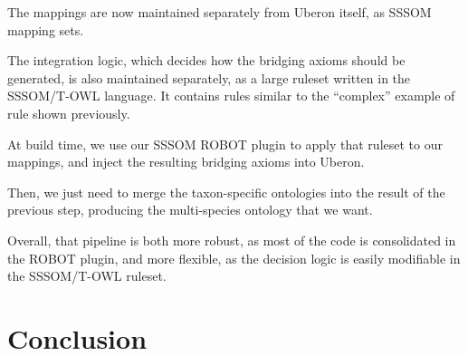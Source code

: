 \begin{frame}
{  The mappings are now maintained separately from Uberon itself, as SSSOM
  mapping sets.

  The integration logic, which decides how the bridging axioms should be
  generated, is also maintained separately, as a large ruleset written in the
  SSSOM/T-OWL language. It contains rules similar to the ``complex'' example
  of rule shown previously.

  At build time, we use our SSSOM ROBOT plugin to apply that ruleset to our
  mappings, and inject the resulting bridging axioms into Uberon.

  Then, we just need to merge the taxon-specific ontologies into the result of
  the previous step, producing the multi-species ontology that we want.

  Overall, that pipeline is both more robust, as most of the code is
  consolidated in the ROBOT plugin, and more flexible, as the decision logic
  is easily modifiable in the SSSOM/T-OWL ruleset.}

\end{frame}

\section{Conclusion}

